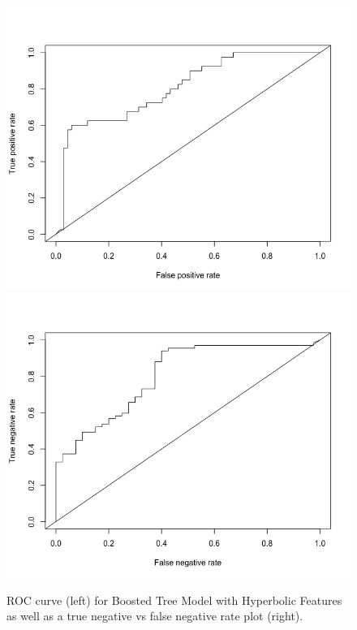 \documentclass[11pt,letterpaper]{article}
\begin{document}
\begin{figure}
\label{rocr}
\caption{ROC curve (left)  for Boosted Tree Model with Hyperbolic Features as well as a true negative vs false negative rate plot (right).}
\centering
\includegraphics[scale=0.3]{rocr}
\includegraphics[scale=0.3]{trueNeg}
\end{figure}
\end{document}
